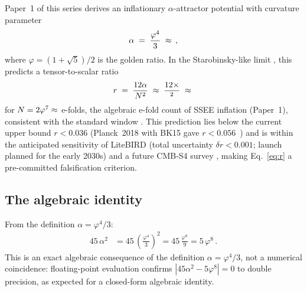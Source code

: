 \documentclass[12pt,a4paper]{article}
\newcommand{\phiG}{\varphi}
\begin{document}
Paper~1 of this series derives an inflationary $\alpha$-attractor potential
with curvature parameter
\begin{equation}
  \alpha \;=\; \frac{\phiG^4}{3}
         \;\approx\; \val{ALPHA_ATT_d4}\,,
  \label{eq:alpha}
\end{equation}
where $\phiG = (1+\sqrt{5})/2$ is the golden ratio.
In the Starobinsky-like limit \citep{Starobinsky1980,Kallosh2013,Galante2015}, this predicts a tensor-to-scalar ratio
\begin{equation}
  r \;=\; \frac{12\alpha}{N^2}
    \;\approx\; \frac{12 \times \val{ALPHA_ATT_d4}}{\val{N_star_d2}^2}
    \;\approx\; \val{R_TENSOR_d5}
  \label{eq:r}
\end{equation}
for $N = 2\varphi^7 \approx \val{N_star_d2}$ e-folds, the algebraic e-fold count of
SSEE inflation (Paper~1), consistent with the standard window \citep{LiddleLeach2003}.
This prediction lies below the current upper bound $r < 0.036$
\citep{BK2021} (Planck~2018 with BK15 gave $r<0.056$~\citep{Akrami2020}) and
is within the anticipated sensitivity of LiteBIRD \citep{LiteBIRD2020} (total
uncertainty $\delta r < 0.001$; launch planned for the early 2030s)
and a future CMB-S4 survey \citep{CMBS4_2016}, making
Eq.~\eqref{eq:r} a pre-committed falsification criterion.

\subsection{The algebraic identity}

From the definition $\alpha = \phiG^4/3$:
\begin{align}
  45\,\alpha^2
    &= 45\,\left(\frac{\phiG^4}{3}\right)^2
     = 45\,\frac{\phiG^8}{9}
     = 5\,\phiG^8\,.
  \label{eq:identity}
\end{align}
This is an exact algebraic consequence of the definition $\alpha = \phiG^4/3$,
not a numerical coincidence: floating-point evaluation confirms $|45\alpha^2 - 5\phiG^8| = 0$
to double precision, as expected for a closed-form algebraic identity.
\end{document}
